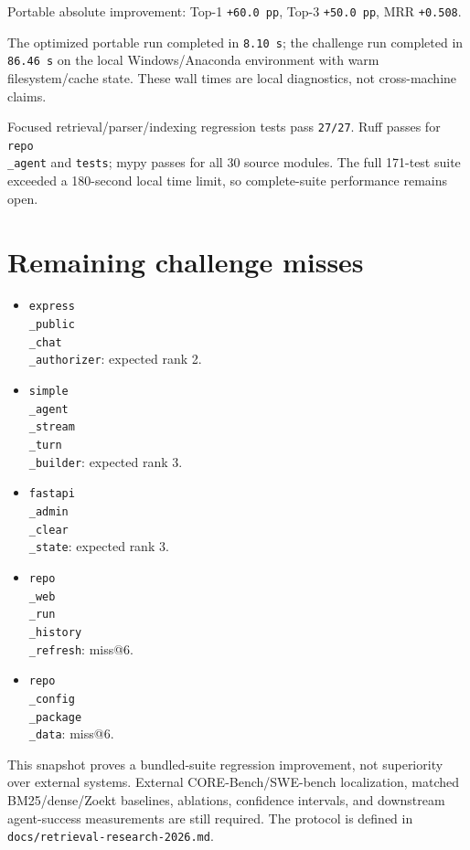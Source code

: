 \documentclass[UTF8,12pt,openany]{ctexbook}
\begin{document}
Portable absolute improvement: Top-1 \texttt{+60.0 pp}, Top-3 \texttt{+50.0 pp}, MRR \texttt{+0.508}.\par

The optimized portable run completed in \texttt{8.10 s}; the challenge run completed in \texttt{86.46 s} on the local Windows/Anaconda environment with warm filesystem/cache state. These wall times are local diagnostics, not cross-machine claims.\par

Focused retrieval/parser/indexing regression tests pass \texttt{27/27}. Ruff passes for \texttt{repo\\_agent} and \texttt{tests}; mypy passes for all 30 source modules. The full 171-test suite exceeded a 180-second local time limit, so complete-suite performance remains open.\par

\section{Remaining challenge misses}

\begin{itemize}
\item \texttt{express\\_public\\_chat\\_authorizer}: expected rank 2.
\item \texttt{simple\\_agent\\_stream\\_turn\\_builder}: expected rank 3.
\item \texttt{fastapi\\_admin\\_clear\\_state}: expected rank 3.
\item \texttt{repo\\_web\\_run\\_history\\_refresh}: miss@6.
\item \texttt{repo\\_config\\_package\\_data}: miss@6.
\end{itemize}

This snapshot proves a bundled-suite regression improvement, not superiority over external systems. External CORE-Bench/SWE-bench localization, matched BM25/dense/Zoekt baselines, ablations, confidence intervals, and downstream agent-success measurements are still required. The protocol is defined in \texttt{docs/retrieval-research-2026.md}.\par
\backmatter
\end{document}
